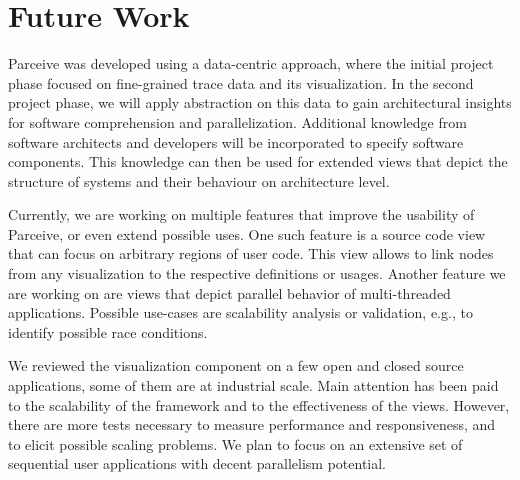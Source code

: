 \section{Future Work}
\label{sec:future_work}
Parceive was developed using a data-centric approach, where the initial project
phase focused on fine-grained trace data and its visualization. In the second
project phase, we will apply abstraction on this data to gain architectural
insights for software comprehension and parallelization. Additional knowledge
from software architects and developers will be incorporated to specify
software components. This knowledge can then be used for extended views that
depict the structure of systems and their behaviour on architecture level.

Currently, we are working on multiple features that improve the usability of
Parceive, or even extend possible uses. One such feature is a source code view
that can focus on arbitrary regions of user code. This view allows to link
nodes from any visualization to the respective definitions or usages. Another
feature we are working on are views that depict parallel behavior of
multi-threaded applications. Possible use-cases are scalability analysis or
validation, e.g., to identify possible race conditions.

We reviewed the visualization component on a few open and closed source
applications, some of them are at industrial scale. Main attention has been paid
to the scalability of the framework and to the effectiveness of the views.
However, there are more tests necessary to measure performance and
responsiveness, and to elicit possible scaling problems. We plan to focus on an
extensive set of sequential user applications with decent parallelism
potential.